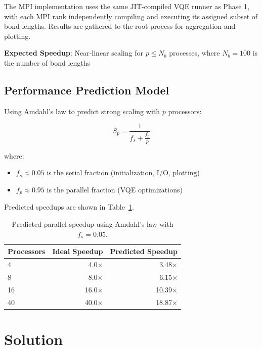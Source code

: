 \documentclass[11pt]{article}
\begin{document}
The MPI implementation uses the same JIT-compiled VQE runner as Phase 1, with each MPI rank independently compiling and executing its assigned subset of bond lengths. Results are gathered to the root process for aggregation and plotting.

\textbf{Expected Speedup}: Near-linear scaling for $p \leq N_b$ processes, where $N_b = 100$ is the number of bond lengths

\subsection{Performance Prediction Model}

Using Amdahl's law to predict strong scaling with $p$ processors:

\begin{equation}
    S_p = \frac{1}{f_s + \frac{f_p}{p}}
\end{equation}

where:
\begin{itemize}
    \item $f_s \approx 0.05$ is the serial fraction (initialization, I/O, plotting)
    \item $f_p \approx 0.95$ is the parallel fraction (VQE optimizations)
\end{itemize}

Predicted speedups are shown in Table~\ref{tab:predictions}.

\begin{table}[h]
    \centering
    \begin{tabular}{lrr}
        \toprule
        \textbf{Processors} & \textbf{Ideal Speedup} & \textbf{Predicted Speedup} \\
        \midrule
        4                   & 4.0$\times$            & 3.48$\times$               \\
        8                   & 8.0$\times$            & 6.15$\times$               \\
        16                  & 16.0$\times$           & 10.39$\times$              \\
        40                  & 40.0$\times$           & 18.87$\times$              \\
        \bottomrule
    \end{tabular}
    \caption{Predicted parallel speedup using Amdahl's law with $f_s = 0.05$.}
    \label{tab:predictions}
\end{table}

\section{Solution}
\end{document}
